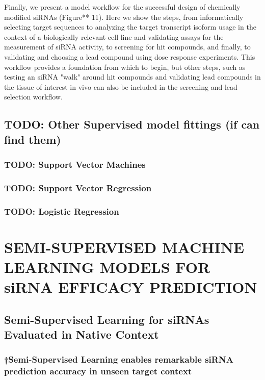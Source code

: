 \documentclass{report}
\begin{document}
Finally, we present a model workflow for the successful design of chemically modified siRNAs (Figure** 11). Here we show the steps, from informatically selecting target sequences to analyzing the target transcript isoform usage in the context of a biologically relevant cell line and validating assays for the measurement of siRNA activity, to screening for hit compounds, and finally, to validating and choosing a lead compound using dose response experiments. This workflow provides a foundation from which to begin, but other steps, such as testing an siRNA "walk" around hit compounds and validating lead compounds in the tissue of interest in vivo can also be included in the screening and lead selection workflow.




\section{TODO: Other Supervised model fittings (if can find them)}
\subsection{TODO: Support Vector Machines}
\subsection{TODO: Support Vector Regression}
\subsection{TODO: Logistic Regression}


\chapter{SEMI-SUPERVISED MACHINE LEARNING MODELS FOR siRNA EFFICACY PREDICTION}
\section{Semi-Supervised Learning for siRNAs Evaluated in Native Context}
\subsection{†Semi-Supervised Learning enables remarkable siRNA prediction accuracy in unseen target context}
\end{document}
